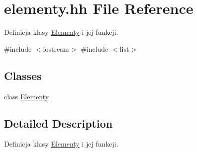 \hypertarget{elementy_8hh}{\section{elementy.\-hh \-File \-Reference}
\label{elementy_8hh}
}


\-Definicja klasy \hyperlink{class_elementy}{\-Elementy} i jej funkcji.  


{\ttfamily \#include $<$iostream$>$}\*
{\ttfamily \#include $<$list$>$}\*
\subsection*{\-Classes}
\begin{DoxyCompactItemize}
\item 
class \hyperlink{class_elementy}{\-Elementy}
\end{DoxyCompactItemize}


\subsection{\-Detailed \-Description}
\-Definicja klasy \hyperlink{class_elementy}{\-Elementy} i jej funkcji. 